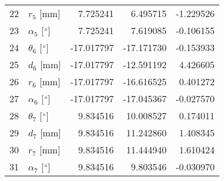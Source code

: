 \documentclass{standalone}%
\begin{document}
\begin{tabular}{llrrr}
22 &              $r_{5}$ [mm] &   7.725241 &   6.495715 &  -1.229526 \\
23 &  $\alpha_{5}$ [$\degree$] &   7.725241 &   7.619085 &  -0.106155 \\
24 &  $\theta_{6}$ [$\degree$] & -17.017797 & -17.171730 &  -0.153933 \\
25 &              $d_{6}$ [mm] & -17.017797 & -12.591192 &   4.426605 \\
26 &              $r_{6}$ [mm] & -17.017797 & -16.616525 &   0.401272 \\
27 &  $\alpha_{6}$ [$\degree$] & -17.017797 & -17.045367 &  -0.027570 \\
28 &  $\theta_{7}$ [$\degree$] &   9.834516 &  10.008527 &   0.174011 \\
29 &              $d_{7}$ [mm] &   9.834516 &  11.242860 &   1.408345 \\
30 &              $r_{7}$ [mm] &   9.834516 &  11.444940 &   1.610424 \\
31 &  $\alpha_{7}$ [$\degree$] &   9.834516 &   9.803546 &  -0.030970 \\
\bottomrule
\end{tabular}
%
\end{document}
